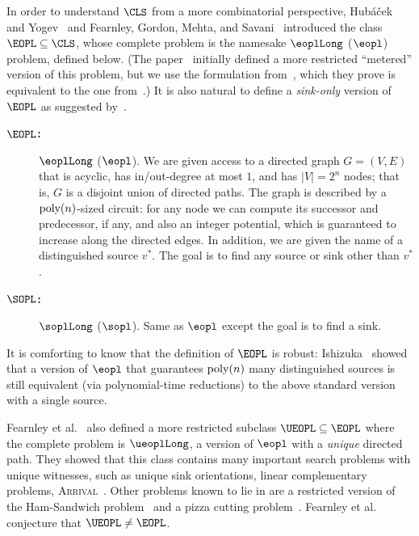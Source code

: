 \documentclass[10pt,a4paper]{article}
\theoremstyle{definition}
\theoremstyle{plain}
\theoremstyle{remark}
\newcommand{\poly}{\textup{poly}}
\begin{document}
In order to understand $\CLS$ from a more combinatorial perspective, Hub{\'a}{\v{c}}ek and Yogev~\cite{Hubacek2020} and Fearnley, Gordon, Mehta, and Savani~\cite{Fearnley2020} introduced the class~$\EOPL\subseteq\CLS$, whose complete problem is the namesake $\eoplLong$ ($\eopl$) problem, defined below. (The paper~\cite{Hubacek2020} initially defined a more restricted ``metered'' version of this problem, but we use the formulation from~\cite{Fearnley2020}, which they prove is equivalent to the one from~\cite{Hubacek2020}.) It is also natural to define a \emph{sink-only} version of $\EOPL$ as suggested by~\cite{Goos2018}.
\begin{description}
\item[\bf $\EOPL$:] $\eoplLong$ ($\eopl$). We are given access to a directed graph $G=(V,E)$ that is acyclic, has in/out-degree at most $1$, and has $|V|=2^n$ nodes; that is, $G$ is a disjoint union of directed paths. The graph is described by a $\poly(n)$-sized circuit: for any node we can compute its successor and predecessor, if any, and also an integer potential, which is guaranteed to increase along the directed edges. In addition, we are given the name of a distinguished source $v^*$. The goal is to find any source or sink other than $v^*$.

\item[\bf $\SOPL$:] $\soplLong$ ($\sopl$). Same as $\eopl$ except the goal is to find a sink.
\end{description}
It is comforting to know that the definition of $\EOPL$ is robust: Ishizuka~\cite{Ishizuka2021} showed that a version of $\eopl$ that guarantees $\poly(n)$ many distinguished sources is still equivalent (via polynomial-time reductions) to the above standard version with a single source.

Fearnley et al.~\cite{Fearnley2020} also defined a more restricted subclass $\UEOPL\subseteq\EOPL$ where the complete problem is $\ueoplLong$, a version of $\eopl$ with a \emph{unique} directed path. They showed that this class contains many important search problems with unique witnesses, such as unique sink orientations, linear complementary problems, {\scshape Arrival}~\cite{Dohrau2017,Gaertner2018}. Other problems known to lie in \UEOPL are a restricted version of the Ham-Sandwich problem~\cite{Chiu2020} and a pizza cutting problem~\cite{Schnider2021}. Fearnley et al.~\cite{Fearnley2020} conjecture that $\UEOPL\neq\EOPL$.
\end{document}
